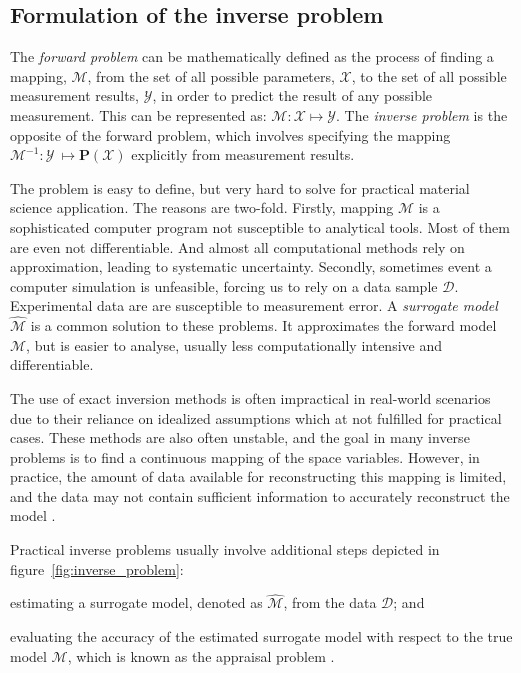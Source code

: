 \subsection{Formulation of the inverse problem}
\label{subsec:intro:formalism}
The \emph{forward problem} can be mathematically defined as the process of finding a mapping, $\mathcal{M}$, from the set of all possible parameters, $\mathcal{X}$, to the set of all possible measurement results, $\mathcal{Y}$, in order to predict the result of any possible measurement. This can be represented as: $\mathcal{M}: \mathcal{X} \mapsto \mathcal{Y}$. The \emph{inverse problem} is the opposite of the forward problem, which involves specifying the mapping $\mathcal{M}^{-1}: \mathcal{Y}\ \mapsto \textbf{P}\left(\mathcal{X}\right)$ explicitly from measurement results.

The problem is easy to define, but very hard to solve for practical material science application. The reasons are two-fold. Firstly, mapping $\mathcal{M}$ is a sophisticated computer program not susceptible to analytical tools. Most of them are even not differentiable. And almost all computational methods rely on approximation, leading to systematic uncertainty. Secondly, sometimes event a computer simulation is unfeasible, forcing us to rely on a data sample $\mathcal{D}$. Experimental data are are susceptible to measurement error. A \emph{surrogate model} $\widehat{\mathcal{M}}$ is a common solution to these problems. It approximates the forward model $\mathcal{M}$, but is easier to analyse, usually less computationally intensive and differentiable.

The use of exact inversion methods is often impractical in real-world scenarios due to their reliance on idealized assumptions which at not fulfilled for practical cases. These methods are also often unstable, and the goal in many inverse problems is to find a continuous mapping of the space variables. However, in practice, the amount of data available for reconstructing this mapping is limited, and the data may not contain sufficient information to accurately reconstruct the model \cite{sniederLinearNonlinearInverse2000}.

Practical inverse problems usually involve additional steps depicted in figure~\ref{fig:inverse_problem}: 
\begin{enumerate*}[label=(\alph*)]
    \item estimating a surrogate model, denoted as $\widehat{\mathcal{M}}$, from the data $\mathcal{D}$; and
    \item evaluating the accuracy of the estimated surrogate model with respect to the true model $\mathcal{M}$, which is known as the appraisal problem \cite{sniederLinearNonlinearInverse2000}.
\end{enumerate*}

